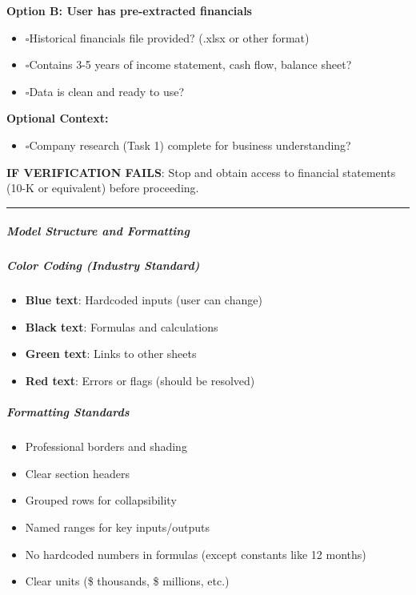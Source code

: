 \documentclass[11pt]{article}
\newcommand{\UncheckedBox}{$\square$}
\begin{document}
\textbf{Option B: User has pre-extracted financials}

\begin{itemize}[leftmargin=*,itemsep=2pt,topsep=2pt]
\item {} \UncheckedBox Historical financials file provided? (.xlsx or other format)
\item {} \UncheckedBox Contains 3-5 years of income statement, cash flow, balance sheet?
\item {} \UncheckedBox Data is clean and ready to use?
\end{itemize}

\textbf{Optional Context:}

\begin{itemize}[leftmargin=*,itemsep=2pt,topsep=2pt]
\item {} \UncheckedBox Company research (Task 1) complete for business understanding?
\end{itemize}

\textbf{IF VERIFICATION FAILS}: Stop and obtain access to financial statements (10-K or equivalent) before proceeding.


\vspace{0.5em}\hrule\vspace{0.5em}

\subparagraph{Model Structure and Formatting}\mbox{}\par

\subparagraph{Color Coding (Industry Standard)}\mbox{}\par
\begin{itemize}[leftmargin=*,itemsep=2pt,topsep=2pt]
\item {} \textbf{Blue text}: Hardcoded inputs (user can change)
\item {} \textbf{Black text}: Formulas and calculations
\item {} \textbf{Green text}: Links to other sheets
\item {} \textbf{Red text}: Errors or flags (should be resolved)
\end{itemize}

\subparagraph{Formatting Standards}\mbox{}\par
\begin{itemize}[leftmargin=*,itemsep=2pt,topsep=2pt]
\item {} Professional borders and shading
\item {} Clear section headers
\item {} Grouped rows for collapsibility
\item {} Named ranges for key inputs/outputs
\item {} No hardcoded numbers in formulas (except constants like 12 months)
\item {} Clear units (\$ thousands, \$ millions, etc.)
\end{itemize}
\end{document}
